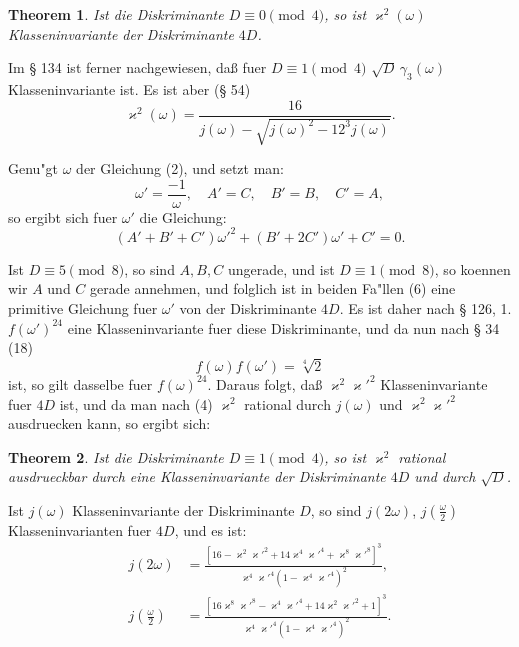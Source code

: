 \documentclass[12pt,a4paper]{article}
\theoremstyle{plain}
\newtheorem{theorem}{Theorem}[section]
\theoremstyle{definition}
\theoremstyle{remark}
\begin{document}
\begin{theorem}
Ist die Diskriminante $D \equiv 0 \pmod{4}$, so ist $\varkappa^2(\omega)$ Klasseninvariante der Diskriminante $4D$.
\end{theorem}

Im \S{} 134 ist ferner nachgewiesen, da\ss{} fuer $D \equiv 1 \pmod{4}$ $\sqrt{D}\, \gamma_3(\omega)$ Klasseninvariante ist. Es ist aber (\S{} 54)
\begin{equation}\label{eq:135_4}
\varkappa^2(\omega) = \frac{16}{j(\omega) - \sqrt{j(\omega)^2 - 12^3 j(\omega)}}.
\end{equation}

Genu"gt $\omega$ der Gleichung (2), und setzt man:
\begin{equation}\label{eq:135_5}
\omega' = \frac{-1}{\omega}, \quad A' = C, \quad B' = B, \quad C' = A,
\end{equation}
so ergibt sich fuer $\omega'$ die Gleichung:
\begin{equation}\label{eq:135_6}
(A' + B' + C')\omega'^2 + (B' + 2C')\omega' + C' = 0.
\end{equation}

Ist $D \equiv 5 \pmod{8}$, so sind $A, B, C$ ungerade, und ist $D \equiv 1 \pmod{8}$, so koennen wir $A$ und $C$ gerade annehmen, und folglich ist in beiden Fa"llen (6) eine primitive Gleichung fuer $\omega'$ von der Diskriminante $4D$. Es ist daher nach \S{} 126, 1. $f(\omega')^{24}$ eine Klasseninvariante fuer diese Diskriminante, und da nun nach \S{} 34 (18)
\[
f(\omega)f(\omega') = \sqrt[4]{2}
\]
ist, so gilt dasselbe fuer $f(\omega)^{24}$. Daraus folgt, da\ss{} $\varkappa^2 \varkappa'^2$ Klasseninvariante fuer $4D$ ist, und da man nach (4) $\varkappa^2$ rational durch $j(\omega)$ und $\varkappa^2 \varkappa'^2$ ausdruecken kann, so ergibt sich:

\begin{theorem}
Ist die Diskriminante $D \equiv 1 \pmod{4}$, so ist $\varkappa^2$ rational ausdrueckbar durch eine Klasseninvariante der Diskriminante $4D$ und durch $\sqrt{D}$.
\end{theorem}

Ist $j(\omega)$ Klasseninvariante der Diskriminante $D$, so sind $j(2\omega)$, $j(\frac{\omega}{2})$ Klasseninvarianten fuer $4D$, und es ist:
\begin{align}
j(2\omega) &= \frac{[16 - \varkappa^2 \varkappa'^2 + 14\varkappa^4 \varkappa'^4 + \varkappa^8 \varkappa'^8]^3}{\varkappa^4 \varkappa'^4 (1 - \varkappa^4 \varkappa'^4)^2}, \label{eq:135_7}\\
j\left(\frac{\omega}{2}\right) &= \frac{[16\varkappa^8 \varkappa'^8 - \varkappa^4 \varkappa'^4 + 14\varkappa^2 \varkappa'^2 + 1]^3}{\varkappa^4 \varkappa'^4 (1 - \varkappa^4 \varkappa'^4)^2}. \label{eq:135_8}
\end{align}
\end{document}
